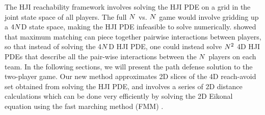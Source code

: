 The HJI reachability framework involves solving the HJI PDE on a grid in the joint state space of all players. The full $N$ vs. $N$ game would involve gridding up a $4N$D state space, making the HJI PDE infeasible to solve numerically. \cite{Chen2014} showed that maximum matching can piece together pairwise interactions between players, so that instead of solving the 4$N$D HJI PDE, one could instead solve $N^2$ 4D HJI PDEs that describe all the pair-wise interactions between the $N$ players on each team. In the following sections, we will present the path defense solution to the two-player game. Our new method approximates 2D slices of the 4D reach-avoid set obtained from solving the HJI PDE, and involves a series of 2D distance calculations which can be done very efficiently by solving the 2D Eikonal equation using the fast marching method (FMM) \cite{Sethian1996}.
